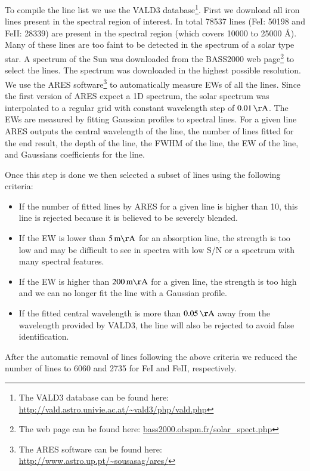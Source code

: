 \documentclass{aa}
\begin{document}
To compile the line list we use the VALD3
database\footnote{The VALD3 database can be found here:
\url{http://vald.astro.univie.ac.at/~vald3/php/vald.php}}. First we
download all iron lines present in the spectral region of interest.
In total 78537 lines (FeI: 50198 and FeII: 28339) are present in
the spectral region (which covers 10000 to 25000 \si{\angstrom}).
Many of these lines are too faint to be detected in the spectrum
of a solar type star. A spectrum of the Sun was downloaded from
the BASS2000 web page\footnote{The web page can be found here:
\url{bass2000.obspm.fr/solar_spect.php}} to select the lines. The
spectrum was downloaded in the highest possible resolution. We use
the ARES software\footnote{The ARES software can be found here:
\url{http://www.astro.up.pt/~sousasag/ares/}}\citep{Sousa2007,Sousa2015a}
to automatically measure EWs of all the lines. Since the first version
of ARES expect a 1D spectrum, the solar spectrum was interpolated to a
regular grid with constant wavelength step of $\SI{0.01}{\AA}$. The EWs
are measured by fitting Gaussian profiles to spectral lines. For a given
line ARES outputs the central wavelength of the line, the number of
lines fitted for the end result, the depth of the line, the FWHM of the
line, the EW of the line, and Gaussians coefficients for the line.

Once this step is done we then selected a subset of lines using the following
criteria:
\begin{itemize}
    \item If the number of fitted lines by ARES for a given line is higher than 10,
        this line is rejected because it is believed to be severely blended.
    \item If the EW is lower than $\SI{5}{m\AA}$ for an absorption line, the strength
        is too low and may be difficult to see in spectra with low S/N or a
        spectrum with many spectral features.
    \item If the EW is higher than $\SI{200}{m\AA}$ for a given line, the strength
        is too high and we can no longer fit the line with a Gaussian profile.
    \item If the fitted central wavelength is more than $\SI{0.05}{\AA}$ away
        from the wavelength provided by VALD3, the line will also be rejected to
        avoid false identification.
\end{itemize}
After the automatic removal of lines following the above criteria
we reduced the number of lines to 6060 and 2735 for FeI and FeII,
respectively.
\end{document}
